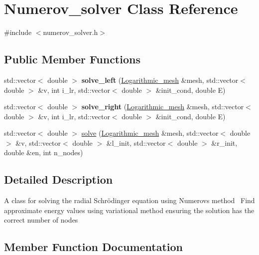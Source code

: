 \hypertarget{classNumerov__solver}{}\section{Numerov\+\_\+solver Class Reference}
\label{classNumerov__solver}


{\ttfamily \#include $<$numerov\+\_\+solver.\+h$>$}

\subsection*{Public Member Functions}
\begin{DoxyCompactItemize}
\item 
\mbox{\label{classNumerov__solver_ac3fd6c0d81fc0802b9412124fcc6562c}} 
std\+::vector$<$ double $>$ {\bfseries solve\+\_\+left} (\hyperlink{classLogarithmic__mesh}{Logarithmic\+\_\+mesh} \&mesh, std\+::vector$<$ double $>$ \&v, int i\+\_\+lr, std\+::vector$<$ double $>$ \&init\+\_\+cond, double E)
\item 
\mbox{\label{classNumerov__solver_aa4c49693edb195503743448b7e490908}} 
std\+::vector$<$ double $>$ {\bfseries solve\+\_\+right} (\hyperlink{classLogarithmic__mesh}{Logarithmic\+\_\+mesh} \&mesh, std\+::vector$<$ double $>$ \&v, int i\+\_\+lr, std\+::vector$<$ double $>$ \&init\+\_\+cond, double E)
\item 
std\+::vector$<$ double $>$ \hyperlink{classNumerov__solver_a741a9a8a2c7f95db8d4e839f73fa7c72}{solve} (\hyperlink{classLogarithmic__mesh}{Logarithmic\+\_\+mesh} \&mesh, std\+::vector$<$ double $>$ \&v, std\+::vector$<$ double $>$ \&l\+\_\+init, std\+::vector$<$ double $>$ \&r\+\_\+init, double \&en, int n\+\_\+nodes)
\end{DoxyCompactItemize}


\subsection{Detailed Description}
A class for solving the radial Schrödinger equation using Numerov\textquotesingle{}s method~\newline
Find approximate energy values using variational method ensuring the solution has the correct number of nodes~\newline


\subsection{Member Function Documentation}
\mbox{\label{classNumerov__solver_a741a9a8a2c7f95db8d4e839f73fa7c72}} 

